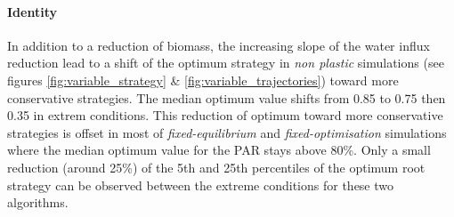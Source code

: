 %

\paragraph{Identity}

In addition to a reduction of biomass, the increasing slope of the water influx reduction lead to a shift of the optimum strategy in \textit{non plastic} simulations (see figures \ref{fig:variable_strategy} \&  \ref{fig:variable_trajectories}) toward more conservative strategies. The median optimum value shifts from 0.85 to 0.75 then 0.35 in extrem conditions. This reduction of optimum toward more conservative strategies is offset in most of \textit{fixed-equilibrium} and \textit{fixed-optimisation} simulations where the median optimum value for the PAR stays above 80\%. Only a small reduction (around 25\%) of the 5th and 25th percentiles of the optimum root strategy can be observed between the extreme conditions for these two algorithms.

